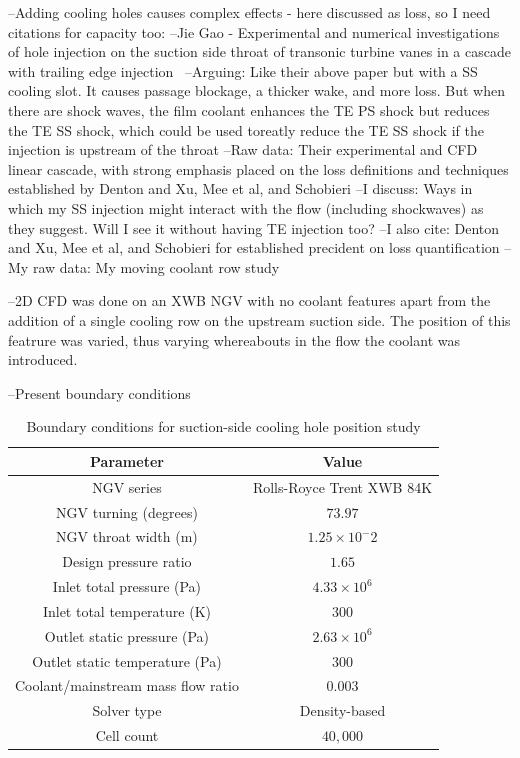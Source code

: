 \documentclass[a4paper, 11pt, twoside]{report}
\begin{document}
--Adding cooling holes causes complex effects - here discussed as loss, so I need citations for capacity too:
--Jie Gao - Experimental and numerical investigations of hole injection on the suction side throat of transonic turbine vanes in a cascade with trailing edge injection~\cite{gao_te_and_film_cooling}
		--Arguing: Like their above paper but with a SS cooling slot. It causes passage blockage, a thicker wake, and more loss. But when there are shock waves, the film coolant enhances the TE PS shock but reduces the TE SS shock, which could be used toreatly reduce the TE SS shock if the injection is upstream of the throat
		--Raw data: Their experimental and CFD linear cascade, with strong emphasis placed on the loss definitions and techniques established by Denton and Xu, Mee et al, and Schobieri
		--I discuss: Ways in which my SS injection might interact with the flow (including shockwaves) as they suggest. Will I see it without having TE injection too?
		--I also cite: Denton and Xu, Mee et al, and Schobieri for established precident on loss quantification
		--My raw data: My moving coolant row study

--2D CFD was done on an XWB NGV with no coolant features apart from the addition of a single cooling row on the upstream suction side. The position of this featrure was varied, thus varying whereabouts in the flow the coolant was introduced.

--Present boundary conditions
\begin{table}[H]
\caption{Boundary conditions for suction-side cooling hole position study}
\label{SCH_parameters}
\begin{center}
\begin{tabular}{|c|c|}
\hline
Parameter & Value\\
\hline
NGV series & Rolls-Royce Trent XWB 84K\\
NGV turning (degrees) & $73.97$\\
NGV throat width (m) & $1.25 \times 10^-2$\\
Design pressure ratio & $1.65$\\
Inlet total pressure (Pa) & $4.33 \times 10^6$\\
Inlet total temperature (K) & $300$\\
Outlet static pressure (Pa) & $2.63 \times 10^6$\\
Outlet static temperature (Pa) & $300$\\
Coolant/mainstream mass flow ratio & $0.003$\\
Solver type & Density-based\\
Cell count & $40,000$\\
\hline
\end{tabular}
\end{center}
\end{table}
\end{document}
